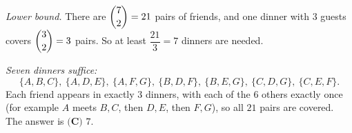\emph{Lower bound.} There are $\dbinom72=21$ pairs of friends, and one dinner with $3$ guests covers $\dbinom32=3$ pairs. So at least $\dfrac{21}{3}=7$ dinners are needed.

\emph{Seven dinners suffice:}
\[\{A,B,C\},\ \{A,D,E\},\ \{A,F,G\},\ \{B,D,F\},\ \{B,E,G\},\ \{C,D,G\},\ \{C,E,F\}.\]
Each friend appears in exactly $3$ dinners, with each of the $6$ others exactly once (for example $A$ meets $B,C$, then $D,E$, then $F,G$), so all $21$ pairs are covered. The answer is $\boxed{\textbf{(C) } 7}$.
